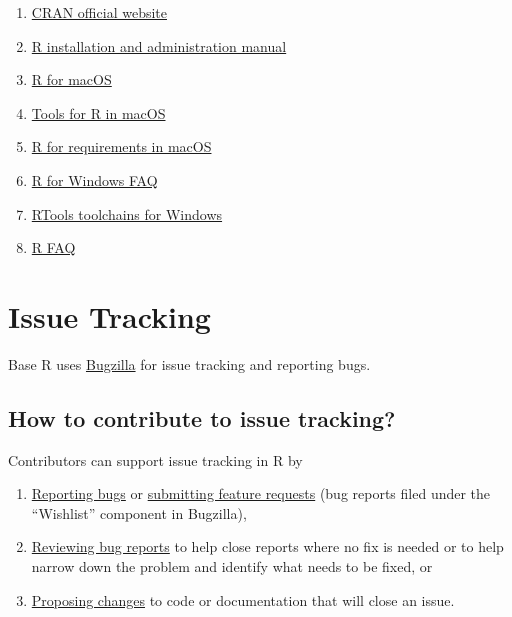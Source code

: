 \documentclass[
  letterpaper,
  DIV=11,
  numbers=noendperiod]{scrreprt}
\begin{document}
\begin{enumerate}
\def\labelenumi{\arabic{enumi}.}
\item
  \href{https://cran.r-project.org}{CRAN official website}
\item
  \href{https://cran.r-project.org/doc/manuals/r-patched/R-admin.html}{R
  installation and administration manual}
\item
  \href{https://mac.r-project.org/}{R for macOS}
\item
  \href{https://mac.r-project.org/tools/}{Tools for R in macOS}
\item
  \href{https://mac.r-project.org/src/}{R for requirements in macOS}
\item
  \href{https://cran.r-project.org/bin/windows/base/rw-FAQ.html}{R for
  Windows FAQ}
\item
  \href{https://cran.r-project.org/bin/windows/Rtools/}{RTools
  toolchains for Windows}
\item
  \href{https://cran.r-project.org/doc/FAQ/R-FAQ.html}{R FAQ}
\end{enumerate}


\chapter{Issue Tracking}\label{IssueTrack}

Base R uses \href{https://bugs.r-project.org/}{Bugzilla} for issue
tracking and reporting bugs.

\section{How to contribute to issue
tracking?}\label{how-to-contribute-to-issue-tracking}

Contributors can support issue tracking in R by

\begin{enumerate}
\def\labelenumi{\arabic{enumi}.}
\item
  \hyperref[ReportingBugs]{Reporting bugs} or
  \hyperref[FeatureRequests]{submitting feature requests} (bug reports
  filed under the ``Wishlist'' component in Bugzilla),
\item
  \href{https://contributor.r-project.org/rdevguide/ReviewBugs.html}{Reviewing
  bug reports} to help close reports where no fix is needed or to help
  narrow down the problem and identify what needs to be fixed, or
\item
  \href{https://contributor.r-project.org/rdevguide/FixBug.html\#FixBug}{Proposing
  changes} to code or documentation that will close an issue.
\end{enumerate}
\end{document}
